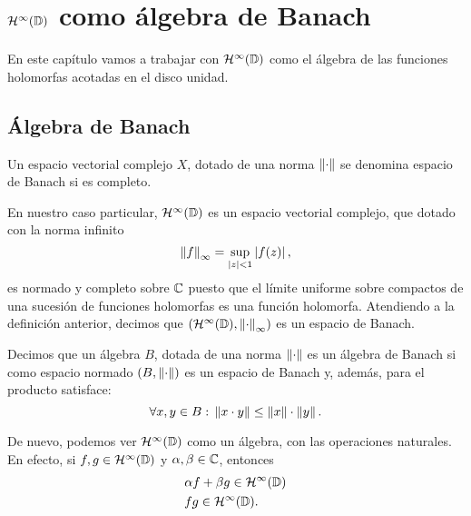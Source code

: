 \chapter{$\mathcal{H}^{\infty}(\mathbb{D})$ como álgebra de Banach}

En este capítulo vamos a trabajar con $\mathcal{H}^{\infty}(\mathbb{D})$ como el álgebra de las funciones holomorfas acotadas en el disco unidad. \\

\section{Álgebra de Banach}

\begin{definition}
    Un espacio vectorial complejo $X$, dotado de una norma $\left\lVert\cdot\right\rVert$ se denomina espacio de Banach si es completo.
\end{definition}
\bigskip

En nuestro caso particular, $\mathcal{H}^{\infty}(\mathbb{D})$ es un espacio vectorial complejo, que dotado con la norma infinito
\begin{equation*}
    \left\lVert f\right\rVert_{\infty} = \sup_{\left\lvert z\right\rvert < 1} \left\lvert f(z)\right\rvert,
\end{equation*}
es normado y completo sobre $\mathbb{C}$ puesto que el límite uniforme sobre compactos de una sucesión de funciones holomorfas es una función holomorfa. Atendiendo a la definición anterior, decimos que  $(\mathcal{H}^{\infty}(\mathbb{D}), \left\lVert\cdot\right\rVert_{\infty})$ es un espacio de Banach. \\

\begin{definition}
    Decimos que un álgebra $B$, dotada de una norma $\left\lVert\cdot\right\rVert$ es un álgebra de Banach si como espacio normado $(B, \left\lVert\cdot\right\rVert)$ es un espacio de Banach y, además, para el producto satisface:
    \begin{equation*}
        \forall x, y \in B: \, \left\lVert x \cdot y\right\rVert \leq \left\lVert x\right\rVert \cdot \left\lVert y\right\rVert.
    \end{equation*}
\end{definition}
\bigskip

De nuevo, podemos ver $\mathcal{H}^{\infty}(\mathbb{D})$ como un álgebra, con las operaciones naturales. En efecto, si $f, g \in \mathcal{H}^{\infty}(\mathbb{D})$ y $\alpha, \beta \in \mathbb{C}$, entonces
\begin{equation*}
    \begin{split}
        & \alpha f + \beta g \in \mathcal{H}^{\infty}(\mathbb{D}) \\
        & fg \in \mathcal{H}^{\infty}(\mathbb{D}).
    \end{split}
\end{equation*} \\

